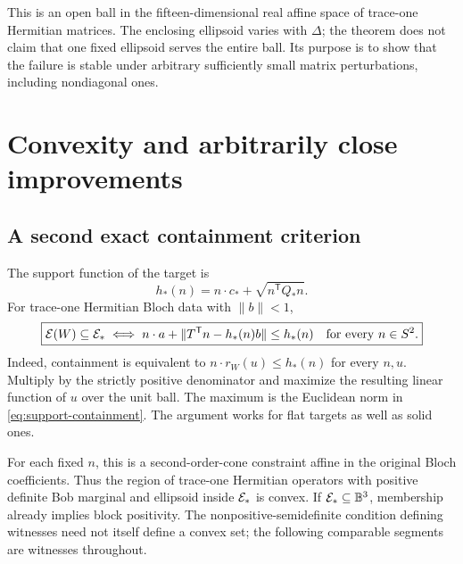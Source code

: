 This is an open ball in the fifteen-dimensional real affine space of trace-one Hermitian matrices. The enclosing ellipsoid varies with $\Delta$; the theorem does not claim that one fixed ellipsoid serves the entire ball. Its purpose is to show that the failure is stable under arbitrary sufficiently small matrix perturbations, including nondiagonal ones.

\section{Convexity and arbitrarily close improvements}

\subsection{A second exact containment criterion}

The support function of the target is
\[
 h_*(n)=n\cdot c_*+\sqrt{n^{\mathsf T}Q_*n}.
\]
For trace-one Hermitian Bloch data with $\|b\|<1$,
\begin{equation}\label{eq:support-containment}
 \boxed{\mathcal E(W)\subseteq\mathcal E_*
 \iff n\cdot a+\|T^{\mathsf T}n-h_*(n)b\|\leq h_*(n)
 \quad\text{for every }n\in S^2.}
\end{equation}
Indeed, containment is equivalent to $n\cdot r_W(u)\leq h_*(n)$ for every $n,u$. Multiply by the strictly positive denominator and maximize the resulting linear function of $u$ over the unit ball. The maximum is the Euclidean norm in \eqref{eq:support-containment}. The argument works for flat targets as well as solid ones.

For each fixed $n$, this is a second-order-cone constraint affine in the original Bloch coefficients. Thus the region of trace-one Hermitian operators with positive definite Bob marginal and ellipsoid inside $\mathcal E_*$ is convex. If $\mathcal E_*\subseteq\mathbb B^3$, membership already implies block positivity. The nonpositive-semidefinite condition defining witnesses need not itself define a convex set; the following comparable segments are witnesses throughout.

